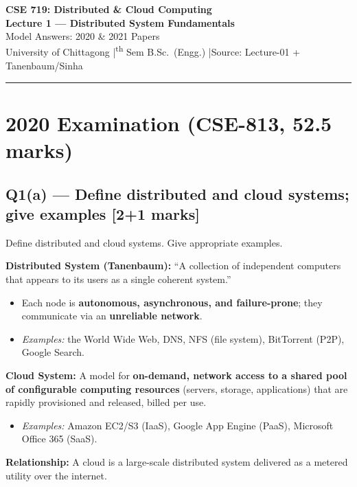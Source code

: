 \documentclass[12pt, a4paper]{article}
\newenvironment{qbox}{\begin{mdframed}[style=qframe]}{\end{mdframed}}
\newenvironment{solbox}{\begin{mdframed}[style=solframe]}{\end{mdframed}}
\newcommand{\qmarks}[1]{\hfill\textbf{\color{orange!70!black}[#1 marks]}}
\begin{document}
\begin{center}
  {\LARGE\bfseries\color{sectionblue} CSE 719: Distributed \& Cloud Computing}\\[0.5em]
  {\Large\bfseries Lecture 1 — Distributed System Fundamentals}\\[0.3em]
  {\large Model Answers: 2020 \& 2021 Papers}\\[0.2em]
  {\small University of Chittagong \quad|\textsuperscript{th} Sem B.Sc.\ (Engg.) \quad|\quad Source: Lecture-01 + Tanenbaum/Sinha}
\end{center}

\vspace{0.3em}\noindent\rule{\linewidth}{1pt}\vspace{0.5em}
\tableofcontents
\newpage

\section{2020 Examination (CSE-813, 52.5 marks)}

\subsection{Q1(a) — Define distributed and cloud systems; give examples \texorpdfstring{\qmarks{2+1}}{}}
\begin{qbox}Define distributed and cloud systems. Give appropriate examples.\end{qbox}
\begin{solbox}
\textbf{Distributed System (Tanenbaum):}
``A collection of independent computers that appears to its users as a single coherent system.''
\begin{itemize}[leftmargin=1.4cm, itemsep=1pt]
  \item Each node is \textbf{autonomous, asynchronous, and failure-prone}; they communicate via an \textbf{unreliable network}.
  \item \textit{Examples:} the World Wide Web, DNS, NFS (file system), BitTorrent (P2P), Google Search.
\end{itemize}

\textbf{Cloud System:}
A model for \textbf{on-demand, network access to a shared pool of configurable computing resources} (servers, storage, applications) that are rapidly provisioned and released, billed per use.
\begin{itemize}[leftmargin=1.4cm, itemsep=1pt]
  \item \textit{Examples:} Amazon EC2/S3 (IaaS), Google App Engine (PaaS), Microsoft Office 365 (SaaS).
\end{itemize}

\textbf{Relationship:} A cloud is a large-scale distributed system delivered as a metered utility over the internet.
\end{solbox}
\end{document}
